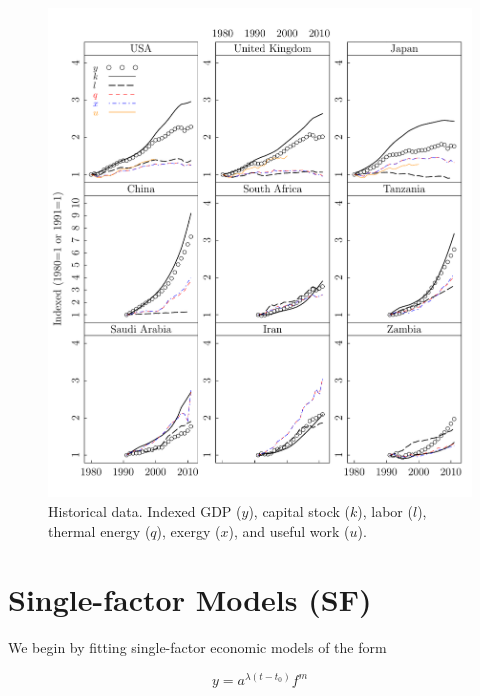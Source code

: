 \documentclass[preprint,authoryear,12pt]{elsarticle}\usepackage{graphicx, color}
\makeatletter
\def\maxwidth{ %
  \ifdim\Gin@nat@width>\linewidth
    \linewidth
  \else
    \Gin@nat@width
  \fi
}
\newenvironment{knitrout}{}{} %
\makeatother
\begin{document}
\begin{knitrout}
\color{fgcolor}\begin{figure}[H]

\includegraphics[width=\maxwidth]{figure/Factors_Lattice_Graph} \caption[Historical data]{Historical data. Indexed GDP ($y$), capital stock ($k$), labor ($l$), thermal energy ($q$), exergy ($x$), and useful work ($u$).\label{fig:Factors_Lattice_Graph}}
\end{figure}


\end{knitrout}


\section{Single-factor Models (SF)}




We begin by fitting single-factor economic models of the form

\begin{equation} \label{eq:Single_Factor_Generic}
  y = a^{\lambda (t-t_0)}f^{m}
\end{equation}
\end{document}
